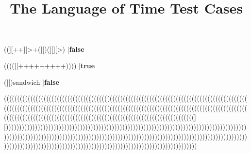 \documentclass{../../codeproblem}
\begin{document}
\title{The Language of Time Test Cases}

\begin{example}
((][++][>+(][)(][][>(][){
|\textbf{true}\end{example}

\begin{example}
((][++][>+(][)(][][>)
|\textbf{false}\end{example}

\begin{example}
((((][+++++++++))))
|\textbf{true}\end{example}

\begin{example}
(][)sandwich
|\textbf{false}\end{example}

\begin{example}
((((((((((((((((((((((((((((((((((((((((((((((((((((((((((((((((((((((((((((((((((((((((((((((((((((((((((((((((((((((((((((((((((((((((((((((((((((((((((((((((((((((((((((((((((((((((((((((((((((((((((((((((((((((((((((((((((((((((((((((((((((((((((((((((][))))))))))))))))))))))))))))))))))))))))))))))))))))))))))))))))))))))))))))))))))))))))))))))))))))))))))))))))))))))))))))))))))))))))))))))))))))))))))))))))))))))))))))))))))))))))))))))))))))))))))))))))))))))))))))))))))))))))))))))))))))))))))))))))
\end{example}
\end{document}
